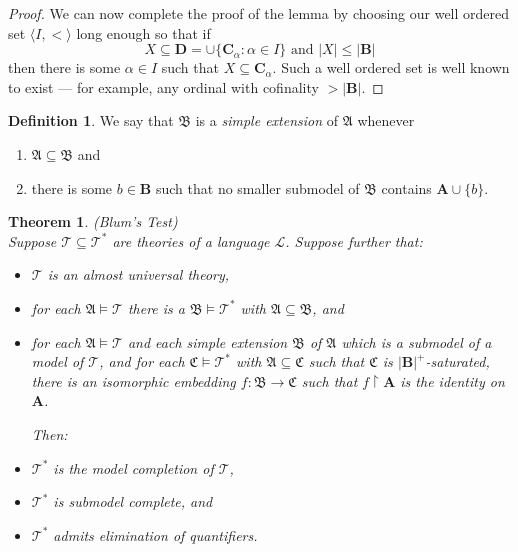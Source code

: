 \documentclass[titlepage, oneside]{amsbook}
\theoremstyle{plain}
\newtheorem{theorem}{Theorem}
\theoremstyle{definition}
\newtheorem{definition}{Definition}
\theoremstyle{remark}
\newcommand{\amt}{\ensuremath{\mathfrak A \models \mathcal T }}
\newcommand{\theory}{\ensuremath{\mathcal{T}}}
\newcommand{\tee}{\ensuremath{\mathcal{T}}}
\newcommand{\tst}{\ensuremath{\mathcal{T}^{\ast}}}
\newcommand{\tstar}{\ensuremath{\mathcal{T}^{\ast}}}
\newcommand{\lan}{\ensuremath{\mathcal{L}}}
\newcommand{\seq}{\ensuremath{\subseteq}}
\newcommand{\ma}{\ensuremath{\mathfrak{A}}}
\newcommand{\mb}{\ensuremath{\mathfrak{B}}}
\newcommand{\mc}{\ensuremath{\mathfrak{C}}}
\newcommand{\ba}{\ensuremath{\mathbf{A}}}
\newcommand{\bb}{\ensuremath{\mathbf{B}}}
\newcommand{\bc}{\ensuremath{\mathbf{C}}}
\newcommand{\bd}{\ensuremath{\mathbf{D}}}
\begin{document}
\begin{proof}
We can now complete the proof of the lemma by choosing our well
ordered set $\langle I , < \rangle$ long enough so that if \[ X \seq
\bd = \cup \{ \bc_\alpha : \alpha \in I \}  \mbox{\ \ and \ }|X| \leq |\bb| \]
then there is some $\alpha \in I$ such that $X \seq \bc_\alpha$.  Such a
well ordered set is well known to exist --- for example, any ordinal
with cofinality $> |\bb|$.

\end{proof}

\begin{definition}
%
 We say that $\mb$ is a \emph{simple extension} of $\ma $ whenever 
\begin{enumerate}
 \item $\ma \seq \mb$ and 
\item there is some 
$b \in \bb$ such that no smaller submodel of $\mb$ contains $\ba 
\cup \{ b\}$.

\end{enumerate}
\end{definition}

\begin{theorem}\label{T:blum} (Blum's Test)\\
%
Suppose $\theory \seq \theory^{\ast}$ are theories of a language $\lan$.  
Suppose further that:
\begin{itemize}
\item[(1)] $\theory$ is an almost universal theory,
\item[(2)] for each $\ma \models \theory$ there is a 
$\mb \models \tstar$ with $\ma \seq \mb$, and  
\item[(3)] for each $\amt$ and each simple extension $\mb$ of $\ma$ which  
is a submodel of a model of $\tee$, and for each $\mc
\models \theory^{\ast}$ with $\ma \seq \mc$ such that
$\mc$ is  $|\bb|^{+} $-saturated, there is an isomorphic 
embedding $f:\mb \to \mc$ such that $f \! \upharpoonright \! \ba$
is the identity on $\ba$.
\begin{flushleft} Then:
\end{flushleft}
\item[(4)]  $\tst$ is the model completion of $\tee$,
\item[(5)]  $\tst$ is submodel complete, and
\item[(6)]  $\tst$ admits elimination of quantifiers.
\end{itemize} 
\end{theorem}
\end{document}
